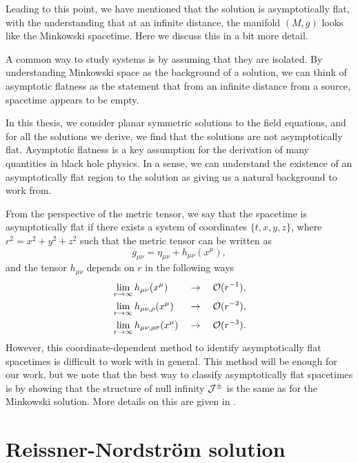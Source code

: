 Leading to this point, we have mentioned that the \sch solution is asymptotically flat, with the understanding that at an infinite distance, the manifold $(M,g)$ looks like the Minkowski spacetime. Here we discuss this in a bit more detail.

A common way to study systems is by assuming that they are isolated. By understanding Minkowski space as the background of a solution, we can think of asymptotic flatness as the statement that from an infinite distance from a source, spacetime appears to be empty. 

In this thesis, we consider planar symmetric solutions to the field equations, and for all the solutions we derive, we find that the solutions are not asymptotically flat. Asymptotic flatness is a key assumption for the derivation of many quantities in black hole physics. In a sense, we can understand the existence of an asymptotically flat region to the solution as giving us a natural background to work from.

From the perspective of the metric tensor, we say that the spacetime is asymptotically flat if there exists a system of coordinates $\{t,x,y,z\}$, where $r^2 = x^2 + y^2 + z^2$ such that the metric tensor can be written as
\begin{equation*}
	g_{\mu \nu} = \eta_{\mu \nu} + h_{\mu \nu}(x^\mu),
\end{equation*}
and the tensor $h_{\mu \nu}$ depends on $r$ in the following ways
\begin{equation*}
\begin{aligned}
	&\lim_{r \rightarrow \infty} h_{\mu \nu}(x^\mu) & &\rightarrow \quad {\cal O}(r^{-1}), \\
	&\lim_{r \rightarrow \infty} h_{\mu \nu, \rho}(x^\mu) & &\rightarrow \quad {\cal O}(r^{-2}) ,\\
	&\lim_{r \rightarrow \infty} h_{\mu \nu, \rho \sigma}(x^\mu) & &\rightarrow \quad {\cal O}(r^{-3}).
\end{aligned}
\end{equation*}
However, this coordinate-dependent method to identify asymptotically flat spacetimes is difficult to work with in general. This method will be enough for our work, but we note that the best way to classify asymptotically flat spacetimes is by showing that the structure of null infinity ${\cal J}^\pm$ is the same as for the Minkowski solution. More details on this are given in \cite{Hawking:1973uf, Wald:106274}.

\section{Reissner-Nordstr\"om solution}
\label{sec:rnsol}
